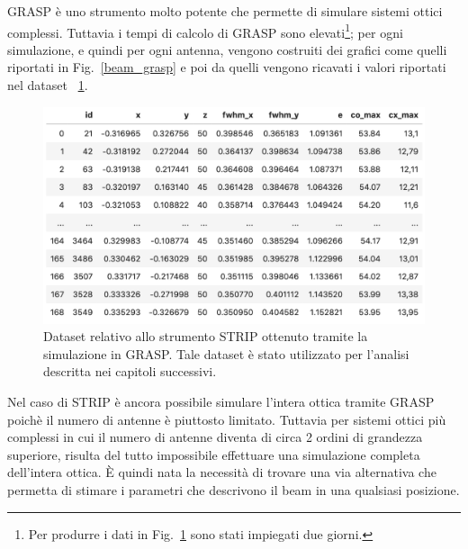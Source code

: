 \documentclass[12pt,a4paper,final]{book}
\begin{document}
GRASP è uno strumento molto potente che permette di simulare sistemi ottici complessi.
Tuttavia i tempi di calcolo di GRASP sono elevati\footnote{Per produrre i dati in Fig.~\ref{dataset} sono stati impiegati due giorni.}; per ogni simulazione, e quindi per ogni antenna, vengono costruiti dei grafici come quelli riportati in Fig.~\ref{beam_grasp} e poi da quelli vengono ricavati i valori riportati nel dataset ~\ref{dataset}.

\begin{figure}[!ht]
	\centering
	\includegraphics[width=0.8\linewidth]{../figures/dataset.png}
	\caption{Dataset relativo allo strumento STRIP ottenuto tramite la simulazione in GRASP. Tale dataset è stato utilizzato per l'analisi descritta nei capitoli successivi.}
	\label{dataset}
\end{figure}

Nel caso di STRIP è ancora possibile simulare l'intera ottica tramite GRASP poichè il numero di antenne è piuttosto limitato. Tuttavia per sistemi ottici più complessi in cui il numero di antenne diventa di circa 2 ordini di grandezza superiore, risulta del tutto impossibile effettuare una simulazione completa dell'intera ottica.
\`E quindi nata la necessità di trovare una via alternativa che permetta di stimare i parametri che descrivono il beam in una qualsiasi posizione.
\end{document}
